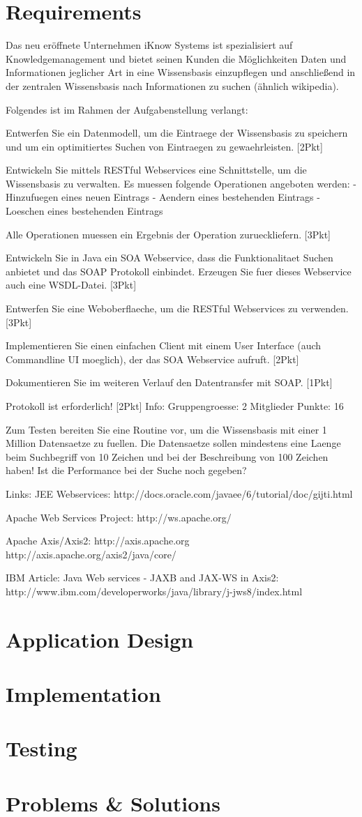 \documentclass[11pt, a4paper]{article}
\begin{document}
\section{Requirements}

Das neu eröffnete Unternehmen iKnow Systems ist spezialisiert auf
Knowledgemanagement und bietet seinen Kunden die Möglichkeiten Daten und
Informationen jeglicher Art in eine Wissensbasis einzupflegen und anschließend
in der zentralen Wissensbasis nach Informationen zu suchen (ähnlich wikipedia).

Folgendes ist im Rahmen der Aufgabenstellung verlangt:

Entwerfen Sie ein Datenmodell, um die Eintraege der Wissensbasis zu speichern
und um ein optimitiertes Suchen von Eintraegen zu gewaehrleisten. [2Pkt]

Entwickeln Sie mittels RESTful Webservices eine Schnittstelle, um die
Wissensbasis zu verwalten. Es muessen folgende Operationen angeboten werden: -
Hinzufuegen eines neuen Eintrags - Aendern eines bestehenden Eintrags -
Loeschen eines bestehenden Eintrags

Alle Operationen muessen ein Ergebnis der Operation zurueckliefern. [3Pkt]

Entwickeln Sie in Java ein SOA Webservice, dass die Funktionalitaet Suchen
anbietet und das SOAP Protokoll einbindet. Erzeugen Sie fuer dieses Webservice
auch eine WSDL-Datei. [3Pkt]

Entwerfen Sie eine Weboberflaeche, um die RESTful Webservices zu verwenden.
[3Pkt]

Implementieren Sie einen einfachen Client mit einem User Interface (auch
Commandline UI moeglich), der das SOA Webservice aufruft. [2Pkt]

Dokumentieren Sie im weiteren Verlauf den Datentransfer mit SOAP. [1Pkt]

Protokoll ist erforderlich! [2Pkt] Info: Gruppengroesse: 2 Mitglieder Punkte:
16

Zum Testen bereiten Sie eine Routine vor, um die Wissensbasis mit einer 1
Million Datensaetze zu fuellen. Die Datensaetze sollen mindestens eine Laenge
beim Suchbegriff von 10 Zeichen und bei der Beschreibung von 100 Zeichen haben!
Ist die Performance bei der Suche noch gegeben?

Links: JEE Webservices: http://docs.oracle.com/javaee/6/tutorial/doc/gijti.html

Apache Web Services Project: http://ws.apache.org/

Apache Axis/Axis2: http://axis.apache.org
http://axis.apache.org/axis2/java/core/

IBM Article: Java Web services - JAXB and JAX-WS in Axis2:
http://www.ibm.com/developerworks/java/library/j-jws8/index.html

\section{Application Design}
\section{Implementation}
\section{Testing}
\section{Problems \& Solutions}

\nocite{*}


\end{document}
